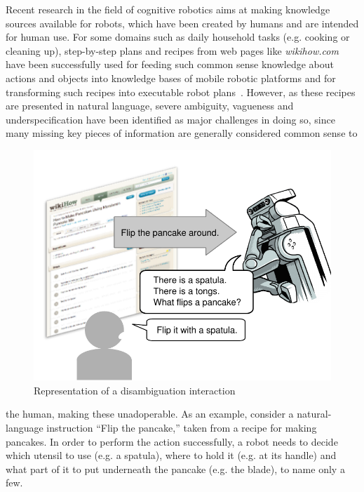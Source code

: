 \documentclass[oribibl]{llncs}
\begin{document}
Recent research in the field of cognitive robotics aims at making 
knowledge sources available for robots, which have been created by 
humans and are intended for human use. For some domains such as 
daily household tasks (e.g. cooking or cleaning up), step-by-step 
plans and recipes from web pages like \textit 
{wikihow.com} have been successfully used for feeding such common 
sense knowledge about actions and objects into knowledge bases of 
mobile robotic platforms and for transforming such recipes into 
executable robot plans~\cite{tenorth10webinstructions}. However, as 
these recipes are presented in natural language, severe ambiguity, 
vagueness and underspecification have been identified as major 
challenges in doing so, since many missing 
key pieces of information are generally considered common sense to 
\begin{figure}[t]
\centering
\includegraphics[scale=0.51, trim = 0mm 0mm 0mm 8mm]{human_robot.pdf}
\caption{Representation of a disambiguation interaction}
\label{fig:application}
\end{figure} 
the human, making these unadoperable.
As an example, consider a natural-language instruction ``Flip the 
pancake,'' taken from a recipe for making pancakes. 
In order to perform the action successfully, a robot needs to decide 
which utensil to use (e.g. a spatula), where to hold it (e.g. at its 
handle) and what part of it to put underneath the pancake (e.g. the 
blade), to name only a few.
\end{document}
